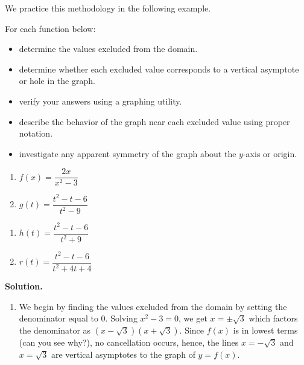 \documentclass{ximera}
\begin{document}
We practice this methodology in the following example.


\begin{example}  \label{vavsholeexample}  For each function below:

\begin{itemize}

\item  determine the values excluded from the domain.

\item   determine whether each excluded value corresponds to a vertical asymptote or hole in the graph.

\item  verify your answers using a graphing utility.

\item  describe the behavior of the graph near each excluded value using proper notation.  

\item  investigate any apparent symmetry of the graph about the $y$-axis or origin.

\end{itemize}

\begin{enumerate}

\item  $f(x) = \dfrac{2x}{x^2-3}$

\item  $g(t) = \dfrac{t^2-t-6}{t^2-9}$

\setcounter{HW}{\value{enumi}}
\end{enumerate}

\begin{enumerate}
\setcounter{enumi}{\value{HW}}


\item  $h(t) = \dfrac{t^2-t-6}{t^2+9}$

\item  $r(t) = \dfrac{t^2-t-6}{t^2+4t+4}$

\setcounter{HW}{\value{enumi}}
\end{enumerate}


{ \bf Solution.} 

\begin{enumerate}

\item  We begin by finding the values excluded from the domain by setting the denominator equal to $0$.  Solving $x^2 - 3 = 0$, we get $x = \pm \sqrt{3}$ which factors the denominator as $(x-\sqrt{3})(x+\sqrt{3})$.  Since  $f(x)$ is in lowest terms (can you see why?), no cancellation occurs,   hence,  the lines $x = -\sqrt{3}$ and $x=\sqrt{3}$ are vertical asymptotes to the graph of $y=f(x)$.  


\end{enumerate}
\end{example}
\end{document}
